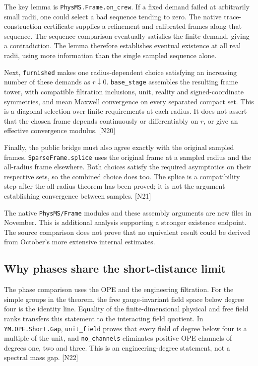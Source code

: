 \documentclass[11pt]{article}
\newcommand{\code}[1]{{\small\nolinkurl{#1}}}
\newcommand{\src}[1]{\textsf{[#1]}}
\begin{document}
The key lemma is \code{PhysMS.Frame.on_crew}. If a fixed demand failed at
arbitrarily small radii, one could select a bad sequence tending to zero.
The native trace-construction certificate supplies a refinement and
calibrated frames along that sequence. The sequence comparison eventually
satisfies the finite demand, giving a contradiction. The lemma therefore
establishes eventual existence at all real radii, using more information
than the single sampled sequence alone.

Next, \code{furnished} makes one radius-dependent choice satisfying an
increasing number of these demands as $r\downarrow0$.
\code{base_stage} assembles the resulting frame tower, with compatible
filtration inclusions, unit, reality and signed-coordinate symmetries, and
mean Maxwell convergence on every separated compact set. This is a
diagonal selection over finite requirements at each radius. It does not
assert that the chosen frame depends continuously or differentiably on
$r$, or give an effective convergence modulus. \src{N20}

Finally, the public bridge must also agree exactly with the original
sampled frames. \code{SparseFrame.splice} uses the original frame at a
sampled radius and the all-radius frame elsewhere. Both choices satisfy
the required asymptotics on their respective sets, so the combined choice
does too. The splice is a compatibility step after the all-radius theorem
has been proved; it is not the argument establishing convergence between
samples. \src{N21}

The native \code{PhysMS/Frame} modules and these assembly arguments are
new files in November. This is additional analysis supporting a stronger
existence endpoint. The source comparison does not prove that no equivalent
result could be derived from October's more extensive internal estimates.

\subsection{Why phases share the short-distance limit}

The phase comparison uses the OPE and the engineering filtration. For the
simple groups in the theorem, the free gauge-invariant field space below
degree four is the identity line. Equality of the finite-dimensional
physical and free field ranks transfers this statement to the interacting
field quotient. In \code{YM.OPE.Short.Gap}, \code{unit_field} proves that
every field of degree below four is a multiple of the unit, and
\code{no_channels} eliminates positive OPE channels of degrees one, two
and three. This is an engineering-degree statement, not a spectral mass
gap. \src{N22}
\end{document}
